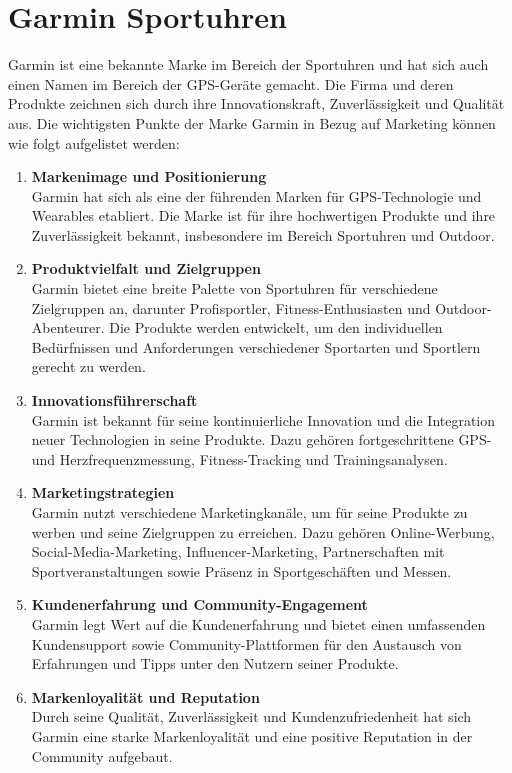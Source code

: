 \section{Garmin Sportuhren} \label{sec:garmin}
Garmin ist eine bekannte Marke im Bereich der Sportuhren und hat sich auch einen Namen im Bereich der GPS-Geräte gemacht. Die Firma und deren Produkte zeichnen sich durch ihre Innovationskraft, Zuverlässigkeit und Qualität aus. Die wichtigsten Punkte der Marke Garmin in Bezug auf Marketing können wie folgt aufgelistet werden:

\begin{enumerate}
    \item \textbf{Markenimage und Positionierung} \\
    Garmin hat sich als eine der führenden Marken für GPS-Technologie und Wearables etabliert. Die Marke ist für ihre hochwertigen Produkte und ihre Zuverlässigkeit bekannt, insbesondere im Bereich Sportuhren und Outdoor.

    \item \textbf{Produktvielfalt und Zielgruppen} \\
    Garmin bietet eine breite Palette von Sportuhren für verschiedene Zielgruppen an, darunter Profisportler, Fitness-Enthusiasten und Outdoor-Abenteurer. Die Produkte werden entwickelt, um den individuellen Bedürfnissen und Anforderungen verschiedener Sportarten und Sportlern gerecht zu werden.

    \item \textbf{Innovationsführerschaft} \\
    Garmin ist bekannt für seine kontinuierliche Innovation und die Integration neuer Technologien in seine Produkte. Dazu gehören fortgeschrittene GPS- und Herzfrequenzmessung, Fitness-Tracking und Trainingsanalysen.

    \item \textbf{Marketingstrategien} \\
    Garmin nutzt verschiedene Marketingkanäle, um für seine Produkte zu werben und seine Zielgruppen zu erreichen. Dazu gehören Online-Werbung, Social-Media-Marketing, Influencer-Marketing, Partnerschaften mit Sportveranstaltungen sowie Präsenz in Sportgeschäften und Messen.

    \item \textbf{Kundenerfahrung und Community-Engagement} \\
    Garmin legt Wert auf die Kundenerfahrung und bietet einen umfassenden Kundensupport sowie Community-Plattformen für den Austausch von Erfahrungen und Tipps unter den Nutzern seiner Produkte.

    \item \textbf{Markenloyalität und Reputation} \\
    Durch seine Qualität, Zuverlässigkeit und Kundenzufriedenheit hat sich Garmin eine starke Markenloyalität und eine positive Reputation in der Community aufgebaut.    
\end{enumerate}

